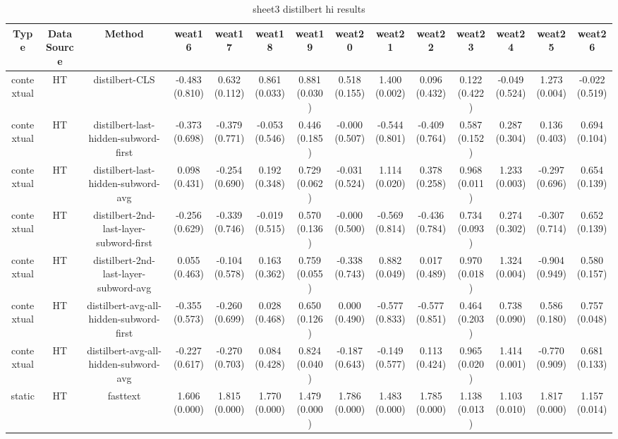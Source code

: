 \begin{sidewaystable}[htb]
    \centering
    \caption{sheet3 distilbert hi results}
    \label{appendix_tab:sheet3_distilbert_hi_results}
    \small
    \begin{tabular}{@{}cccccccccccccc@{}}
        \toprule
        Type & DataSource & Method & weat16 & weat17 & weat18 & weat19 & weat20 & weat21 & weat22 & weat23 & weat24 & weat25 & weat26 \\
        \midrule
        contextual & HT & distilbert-CLS & -0.483 (0.810) & 0.632 (0.112) & 0.861 (0.033) & 0.881 (0.030) & 0.518 (0.155) & 1.400 (0.002) & 0.096 (0.432) & 0.122 (0.422) & -0.049 (0.524) & 1.273 (0.004) & -0.022 (0.519) \\
        contextual & HT & distilbert-last-hidden-subword-first & -0.373 (0.698) & -0.379 (0.771) & -0.053 (0.546) & 0.446 (0.185) & -0.000 (0.507) & -0.544 (0.801) & -0.409 (0.764) & 0.587 (0.152) & 0.287 (0.304) & 0.136 (0.403) & 0.694 (0.104) \\
        contextual & HT & distilbert-last-hidden-subword-avg & 0.098 (0.431) & -0.254 (0.690) & 0.192 (0.348) & 0.729 (0.062) & -0.031 (0.524) & 1.114 (0.020) & 0.378 (0.258) & 0.968 (0.011) & 1.233 (0.003) & -0.297 (0.696) & 0.654 (0.139) \\
        contextual & HT & distilbert-2nd-last-layer-subword-first & -0.256 (0.629) & -0.339 (0.746) & -0.019 (0.515) & 0.570 (0.136) & -0.000 (0.500) & -0.569 (0.814) & -0.436 (0.784) & 0.734 (0.093) & 0.274 (0.302) & -0.307 (0.714) & 0.652 (0.139) \\
        contextual & HT & distilbert-2nd-last-layer-subword-avg & 0.055 (0.463) & -0.104 (0.578) & 0.163 (0.362) & 0.759 (0.055) & -0.338 (0.743) & 0.882 (0.049) & 0.017 (0.489) & 0.970 (0.018) & 1.324 (0.004) & -0.904 (0.949) & 0.580 (0.157) \\
        contextual & HT & distilbert-avg-all-hidden-subword-first & -0.355 (0.573) & -0.260 (0.699) & 0.028 (0.468) & 0.650 (0.126) & 0.000 (0.490) & -0.577 (0.833) & -0.577 (0.851) & 0.464 (0.203) & 0.738 (0.090) & 0.586 (0.180) & 0.757 (0.048) \\
        contextual & HT & distilbert-avg-all-hidden-subword-avg & -0.227 (0.617) & -0.270 (0.703) & 0.084 (0.428) & 0.824 (0.040) & -0.187 (0.643) & -0.149 (0.577) & 0.113 (0.424) & 0.965 (0.020) & 1.414 (0.001) & -0.770 (0.909) & 0.681 (0.133) \\
        static & HT & fasttext & 1.606 (0.000) & 1.815 (0.000) & 1.770 (0.000) & 1.479 (0.000) & 1.786 (0.000) & 1.483 (0.000) & 1.785 (0.000) & 1.138 (0.013) & 1.103 (0.010) & 1.817 (0.000) & 1.157 (0.014) \\

\end{tabular}
\end{sidewaystable}
